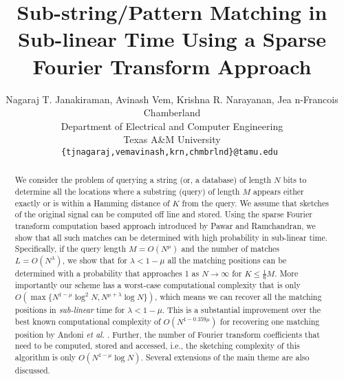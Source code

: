 \documentclass[sigconf]{acmart}
\begin{document}
\title[Sub-string Matching in Sub-linear Time]{Sub-string/Pattern Matching in Sub-linear Time Using a Sparse Fourier Transform Approach}

\author{Nagaraj T. Janakiraman, Avinash Vem, Krishna R. Narayanan, Jea
	n-Francois Chamberland\\
Department of Electrical and Computer Engineering \\
Texas A\&M University\\
{\tt\small {\{tjnagaraj,vemavinash,krn,chmbrlnd\}@tamu.edu} }}

\renewcommand{\shortauthors}{Janakiraman et al.}

\begin{abstract}
	We consider the problem of querying a string (or, a database) of length $N$ bits to determine all the locations where a substring (query) of length $M$ appears either exactly or is within a Hamming distance of $K$ from the query. We assume that sketches of the original signal can be computed off line and stored. Using the sparse Fourier transform computation based approach introduced by Pawar and Ramchandran, we show that all such matches can be determined with high probability in sub-linear time. Specifically, if the query length $M = O(N^\mu)$ and the number of matches $L=O(N^\lambda)$, we show that for $\lambda < 1-\mu$ all the matching positions can be determined with a probability that approaches 1 as $N \rightarrow \infty$ for $K \leq \frac{1}{6}M$. More importantly our scheme has a worst-case computational complexity that is only $O\left(\max\{N^{1-\mu}\log^2 N, N^{\mu+\lambda}\log N \}\right)$, which means we can recover all the matching positions in {\it sub-linear} time for $\lambda<1-\mu$. This is a substantial improvement over the best known computational complexity of $O\left(N^{1-0.359 \mu} \right)$ for recovering one matching position by Andoni {\em et al.} \cite{andoni2013shift}. Further, the number of Fourier transform coefficients that need to be computed, stored and accessed, i.e., the sketching complexity of this algorithm is only $O\left(N^{1-\mu}\log N\right)$. Several extensions of the main theme are also discussed.
\end{abstract}
\end{document}
